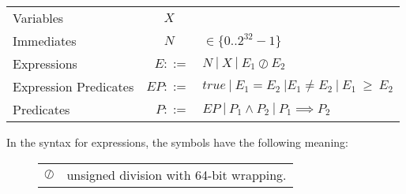   \begin{tabular}{lrl}
    Variables & $X \quad ~$ &\\
    Immediates & $N \quad ~$ & $\in \{0..2^{32}-1\}$  \\
    Expressions & $E ::= $ & $N ~  | ~ X ~ | ~ E_1 \oslash E_2$ \\
    Expression Predicates & $EP ::=$ & $true ~ | ~ E_1 = E_2 ~ | E_1 \neq E_2 ~ | ~ E_1 ~ \geq ~ E_2 $ \\
    Predicates & $P ::=$ & $EP ~ | ~ P_1 \land P_2 ~ | ~ P_1 \implies P_2$ \\
\end{tabular}    

In the syntax for expressions, the symbols have the following meaning:

\begin{figure}[ht]
  \centering
  \begin{tabular}{ll}
    $\oslash$ & unsigned division with 64-bit wrapping. \\
    \end{tabular}
\end{figure}







